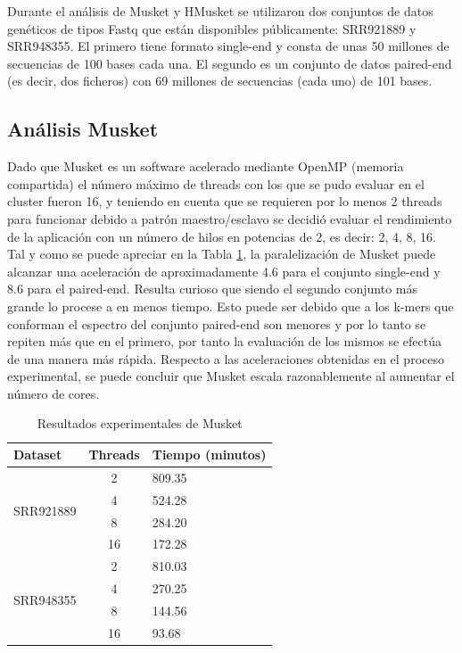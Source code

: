 \documentclass[conference]{IEEEtran}
\begin{document}
Durante el análisis de Musket y HMusket se utilizaron dos conjuntos de datos genéticos de tipos Fastq que están disponibles públicamente: SRR921889 y SRR948355. El primero tiene formato single-end y consta de unas 50 millones de secuencias de 100 bases cada una. El segundo es un conjunto de datos paired-end (es decir, dos ficheros) con 69 millones de secuencias (cada uno) de 101 bases.


\subsection{Análisis Musket}
Dado que Musket es un software acelerado mediante OpenMP (memoria compartida) el número máximo de threads con los que se pudo evaluar en el cluster fueron 16, y teniendo en cuenta que se requieren por lo menos 2 threads para funcionar debido a patrón maestro/esclavo se decidió evaluar el rendimiento de la aplicación con un número de hilos en potencias de 2, es decir: 2, 4, 8, 16.\\

Tal y como se puede apreciar en la Tabla \ref{musket_experiment_result}, la paralelización de Musket puede alcanzar una aceleración de aproximadamente 4.6 para el conjunto single-end y 8.6 para el paired-end. Resulta curioso que siendo el segundo conjunto más grande lo procese a en menos tiempo. Esto puede ser debido que a los k-mers que conforman el espectro del conjunto paired-end son menores y por lo tanto se repiten más que en el primero, por tanto la evaluación de los mismos se efectúa de una manera más rápida. Respecto a las aceleraciones obtenidas en el proceso experimental, se puede concluir que Musket escala razonablemente al aumentar el número de cores.

\begin{table}[t]
	\centering
	\begin{tabular}{|l|c|l|}
		\hline
		\textbf{Dataset} 				& \textbf{Threads} 		& \textbf{Tiempo (minutos)} \\ \hline
		\multirow{ 4}{*}{SRR921889} 	& 2			    		& 809.35 	\\ \cline{2-3}
							 			& 4		          		& 524.28	\\ \cline{2-3}
							 			& 8		          		& 284.20 	\\ \cline{2-3}
							 			& 16	           		& 172.28 	\\ \hline \hline
		\multirow{ 4}{*}{SRR948355} 	& 2		         		& 810.03	\\ \cline{2-3}
				 						& 4			           	& 270.25	\\ \cline{2-3}
				 						& 8			          	& 144.56 	\\ \cline{2-3}
				 						& 16	          		& 93.68 	\\ \hline
	\end{tabular}
	\caption{Resultados experimentales de Musket}
	\label{musket_experiment_result}
\end{table}
\end{document}
